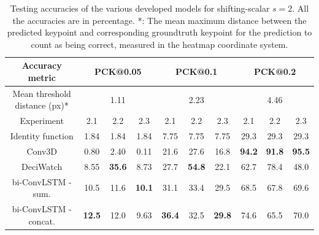 \documentclass[./main.tex]{subfiles}
\begin{document}
\begin{table}[htbp]
    \begin{tabular}{c||ccc|ccc|ccc}
        \hline
        Accuracy metric & \multicolumn{3}{c}{PCK@0.05} & \multicolumn{3}{c}{PCK@0.1} & \multicolumn{3}{c}{PCK@0.2} \\
        \hline
        Mean threshold distance (px)* & \multicolumn{3}{c}{1.11} & \multicolumn{3}{c}{2.23} & \multicolumn{3}{c}{4.46} \\
        \hline
        Experiment & 2.1 & 2.2 & 2.3 & 2.1 & 2.2 & 2.3 & 2.1 & 2.2 & 2.3 \\
        \hline
        \hline
        Identity function & 1.84 & 1.84 & 1.84 & 7.75 & 7.75 & 7.75 & 29.3 & 29.3 & 29.3 \\
        Conv3D & 0.80 & 2.40 & 0.11 & 21.6 & 27.6 & 16.8 & \textbf{94.2} & \textbf{91.8} & \textbf{95.5} \\
        DeciWatch & 8.55 & \textbf{35.6} & 8.73 & 27.7 & \textbf{54.8} & 22.1 & 62.7 & 78.4 & 48.0 \\
        bi-ConvLSTM - sum. & 10.5 & 11.6 & \textbf{10.1} & 31.1 & 33.4 & 29.5 & 68.5 & 67.8 & 69.6 \\
        bi-ConvLSTM - concat. & \textbf{12.5} & 12.0 & 9.63 & \textbf{36.4} & 32.5 & \textbf{29.8} & 74.6 & 65.5 & 70.0 \\
        \hline
    \end{tabular}
    \caption{Testing accuracies of the various developed models for shifting-scalar $s = 2$. All the accuracies are in percentage. *: The mean maximum distance between the predicted keypoint and corresponding groundtruth keypoint for the prediction to count as being correct, measured in the heatmap coordinate system.}
    \label{tab:pretrain_test_accs_2}
\end{table}
\end{document}
